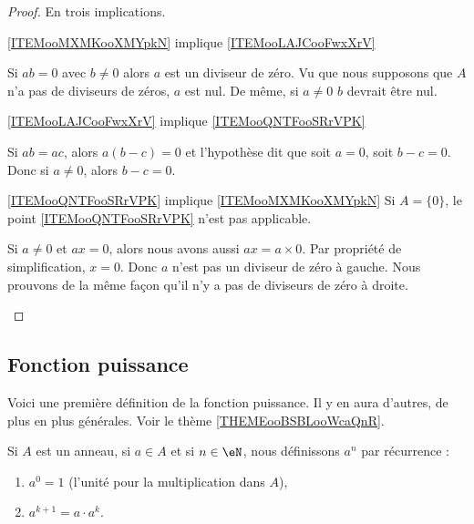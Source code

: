 \begin{proof}
    En trois implications.
    \begin{subproof}
        \item[\ref{ITEMooMXMKooXMYpkN} implique \ref{ITEMooLAJCooFwxXrV}]

            Si \( ab=0\) avec \( b\neq 0\) alors \( a\) est un diviseur de zéro. Vu que nous supposons que \( A\) n'a pas de diviseurs de zéros, \( a\) est nul. De même, si \( a\neq 0\) \( b\) devrait être nul.
        \item[\ref{ITEMooLAJCooFwxXrV} implique \ref{ITEMooQNTFooSRrVPK}]

            Si \( ab=ac\), alors \( a(b-c)=0\) et l'hypothèse dit que soit \( a=0\), soit \( b-c=0\). Donc si \( a\neq 0\), alors \( b-c=0\).
        \item[\ref{ITEMooQNTFooSRrVPK} implique \ref{ITEMooMXMKooXMYpkN}]
            Si \( A=\{ 0 \}\), le point \ref{ITEMooQNTFooSRrVPK} n'est pas applicable.

            Si \( a\neq 0\) et \( ax=0\), alors nous avons aussi \( ax=a\times 0\). Par propriété de simplification, \( x=0\). Donc \( a\) n'est pas un diviseur de zéro à gauche. Nous prouvons de la même façon qu'il n'y a pas de diviseurs de zéro à droite.
    \end{subproof}
\end{proof}


\subsection{Fonction puissance}

Voici une première définition de la fonction puissance. Il y en aura d'autres, de plus en plus générales. Voir le thème \ref{THEMEooBSBLooWcaQnR}.
\begin{definition}\label{DEFooGVSFooFVLtNo}
    Si \( A\) est un anneau, si \( a\in A\) et si \( n\in \eN\), nous définissons \( a^n\) par récurrence :
    \begin{enumerate}
        \item
            \( a^0=1\) (l'unité pour la multiplication dans \( A\)),
        \item       \label{ITEMooOUIPooGjAgQb}
            \( a^{k+1}=a\cdot a^{k}\).
    \end{enumerate}
\end{definition}

